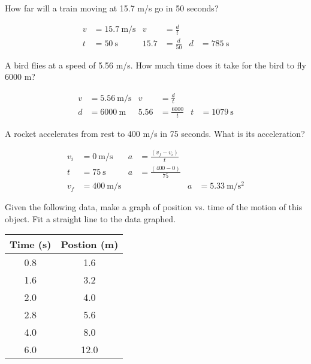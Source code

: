 \documentclass[10pt]{exam}
\begin{document}
\begin{questions}
  \question
  	How far will a train moving at 15.7 m/s go in 50 seconds? 
    \begin{solution}
      \begin{align*}
        v &= \SI{15.7}{\meter\per\second}
                            & v &= \frac{d}{t} \\
        t &= \SI{50}{\second}
                            & 15.7 &= \frac{d}{50} &
                              d &= \SI{785}{\second}
      \end{align*}
    \end{solution}
    \ansblank
  
  \question
    A bird flies at a speed of 5.56 m/s.  How much time does it take for the bird to fly 6000 m?
    \begin{solution}
      \begin{align*}
        v &= \SI{5.56}{\meter\per\second}
                            & v &= \frac{d}{t} \\
                            d &= \SI{6000}{\meter}
                            & 5.56 &= \frac{6000}{t} &
                            t &= \SI{1079}{\second}
      \end{align*}
    \end{solution}
    \ansblank 
  
  \question
    A rocket accelerates from rest to 400 m/s in 75 seconds.  What is its acceleration?
    \begin{solution}
      \begin{align*}
        v_i &= \SI{0}{\meter\per\second}  & 
                  a &= \frac{\left(v_f-v_i\right)}{t} \\
        t &= \SI{75}{\second} &
                  a &= \frac{\left(400-0\right)}{75}  \\
        v_f &= \SI{400}{\meter\per\second} &&&
                    a &= \SI{5.33}{\meter\per\second^2}
      \end{align*}
    \end{solution}
    \ansblank
  
  \pagebreak

  \question
    Given the following data, make a graph of position  vs. time of the motion of this object.  Fit a straight line to the data graphed.  

      \begin{center}
        \begin{tabular}{cc}
          \hline
          Time (s) & Postion (m) \\
          \hline
          0.8      &	1.6        \\
          1.6      &	3.2        \\
          2.0      &  4.0        \\
          2.8      &	5.6        \\
          4.0      &	8.0        \\
          6.0      &	12.0       \\
          \hline\hline
        \end{tabular}
      \end{center}
  

\end{questions}
\end{document}
